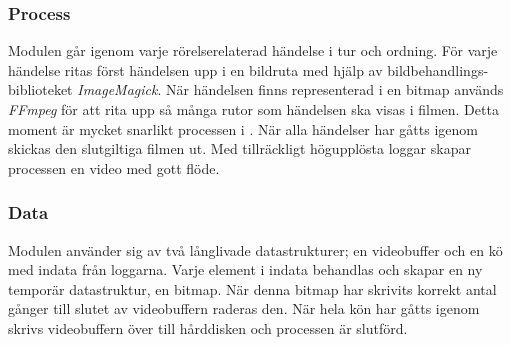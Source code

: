 \subsubsection{Process}
Modulen går igenom varje rörelserelaterad händelse i tur och ordning. För varje händelse ritas först händelsen upp i en bildruta med hjälp av bildbehandlings-biblioteket \textit{ImageMagick}. När händelsen finns representerad i en bitmap används \textit{FFmpeg} för att rita upp så många rutor som händelsen ska visas i filmen. Detta moment är mycket snarlikt processen i . När alla händelser har gåtts igenom skickas den slutgiltiga filmen ut. Med tillräckligt högupplösta loggar skapar processen en video med gott flöde.

\subsubsection{Data}
Modulen använder sig av två långlivade datastrukturer; en videobuffer och en kö med indata från loggarna. Varje element i indata behandlas och skapar en ny temporär datastruktur, en bitmap. När denna bitmap har skrivits korrekt antal gånger till slutet av videobuffern raderas den. När hela kön har gåtts igenom skrivs videobuffern över till hårddisken och processen är slutförd.
